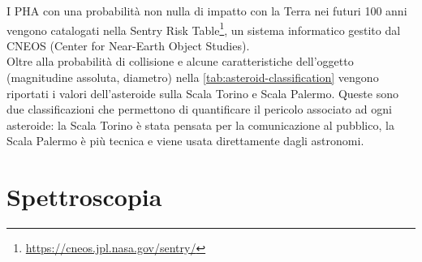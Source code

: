 \documentclass[a4paper,11pt,openright]{book}
\begin{document}
I PHA con una probabilità non nulla di impatto con la Terra nei futuri 100 anni vengono catalogati nella Sentry Risk Table\footnote{\href {https://cneos.jpl.nasa.gov/sentry/}{https://cneos.jpl.nasa.gov/sentry/} }, un sistema informatico gestito dal CNEOS (Center for Near-Earth Object Studies).\\
Oltre alla probabilità di collisione e alcune caratteristiche dell’oggetto (magnitudine assoluta, diametro) nella \cref{tab:asteroid-classification} vengono riportati i valori dell’asteroide sulla Scala Torino e Scala Palermo. Queste sono due classificazioni che permettono di quantificare il pericolo associato ad ogni asteroide: la Scala Torino è stata pensata per la comunicazione al pubblico, la Scala Palermo è più tecnica e viene usata direttamente dagli astronomi.

\chapter{Spettroscopia}\label{ch:ch_2}
\end{document}
